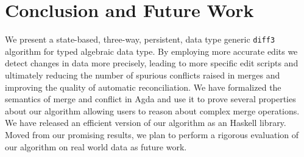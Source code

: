 \documentclass{sigplanconf}
\theoremstyle{plain}
\begin{document}

\section{Conclusion and Future Work}
\label{sec:conclusion}
We present a state-based, three-way, persistent, data type generic
\texttt{diff3} algorithm for typed algebraic data type.
%
By employing more accurate edits we detect changes in data more
precisely, leading to more specific edit scripts and ultimately
reducing the number of spurious conflicts raised in merges and
improving the quality of automatic reconciliation.
%
We have formalized the semantics of merge and conflict in Agda and
use it to prove several properties about our algorithm allowing
users to reason about complex merge operations.
%
We have released an efficient version of our algorithm as an Haskell
library.
%
Moved from our promising results, we plan to perform a rigorous evaluation
of our algorithm on real world data as future work.
%














\listoftodos
\end{document}

